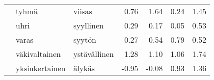 \begin{tabular}{lllrrrr}
    & tyhmä & viisas &         0.76 &               1.64 &               0.24 &                     1.45 \\
    & uhri & syyllinen &         0.29 &               0.17 &               0.05 &                     0.53 \\
    & varas & syytön &         0.27 &               0.54 &               0.79 &                     0.52 \\
    & väkivaltainen & ystävällinen &         1.28 &               1.10 &               1.06 &                     1.74 \\
    & yksinkertainen & älykäs &        -0.95 &              -0.08 &               0.93 &                     1.36 \\
\bottomrule
\end{tabular}
